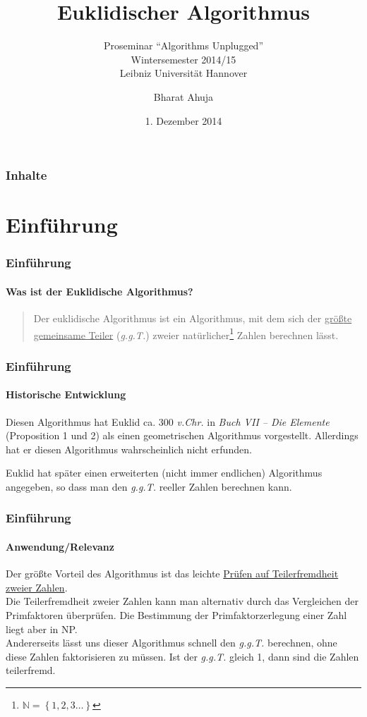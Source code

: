 \documentclass[•]{beamer}
\title{Euklidischer Algorithmus}
\subtitle{Proseminar ``Algorithms Unplugged''\\
Wintersemester 2014/15\\ 
Leibniz Universit\"at Hannover}
\date{1. Dezember 2014}
\author{Bharat Ahuja}
\begin{document}
\maketitle

\begin{frame}
	\frametitle{Inhalte}
	\tableofcontents[]
\end{frame}

\section{Einf\"uhrung}
\begin{frame}
	\frametitle{Einf\"uhrung}
    \framesubtitle{Was ist der Euklidische Algorithmus?}
    \begin{quote}
    Der euklidische Algorithmus ist ein Algorithmus, mit dem sich der 		\underline{gr\"o{\ss}te gemeinsame Teiler} (\textit{g.g.T.}) 			zweier nat\"urlicher\footnote{$\mathbb{N} =  \left\{ 1,2,3\dots \right\}$} Zahlen berechnen l\"asst. 
    
    \end{quote} 
\end{frame}

\begin{frame}       
	\frametitle{Einf\"uhrung}
    \framesubtitle{Historische Entwicklung}
    Diesen Algorithmus hat Euklid ca. 300 \textit{v.Chr.} in 				\textit{Buch VII -- Die Elemente} (Proposition 1 und 2) als einen 		geometrischen Algorithmus vorgestellt. Allerdings hat er diesen Algorithmus wahrscheinlich nicht erfunden.
    
    Euklid hat sp\"ater einen erweiterten (nicht immer endlichen) Algorithmus angegeben, so dass man den \textit{g.g.T.} reeller Zahlen berechnen kann.\end{frame}

\begin{frame}
	\frametitle{Einf\"uhrung}
    \framesubtitle{Anwendung/Relevanz}
    Der gr\"o{\ss}te Vorteil des Algorithmus ist das leichte \underline{Pr\"ufen auf Teilerfremdheit zweier Zahlen}. \\ Die Teilerfremdheit zweier Zahlen kann man alternativ durch das Vergleichen der Primfaktoren \"uberpr\"ufen. Die Bestimmung der Primfaktorzerlegung einer Zahl liegt aber in NP. \\ Andererseits l\"asst uns dieser Algorithmus schnell den \textit{g.g.T.} berechnen, ohne diese Zahlen faktorisieren zu m\"ussen. Ist der \textit{g.g.T.} gleich 1, dann sind die Zahlen teilerfremd.
    
\end{frame}
\end{document}
